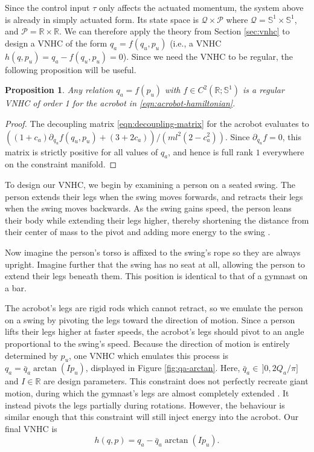 \documentclass[journal,twoside,web, twocolumn,draftcls]{ieeecolor}
\newtheorem{prop}{Proposition} %
\newcommand*{\R}{\mathbb{R}}
\newcommand*{\Sone}{\mathbb{S}^1}
\begin{document}
Since the control input \(\tau\) only affects the actuated momentum,
the system above is already in simply actuated form.
Its state space is \(\mathcal{Q} \times \mathcal{P}\) where
\(\mathcal{Q} = \Sone \times \Sone\), and
\(\mathcal{P} = \R \times \R\).
We can therefore apply the theory from Section \ref{sec:vnhc} to design
a VNHC of the form \(q_a = f(q_u,p_u)\) (i.e., a VNHC 
\(h(q,p_u) = q_a - f(q_u,p_u) = 0\)).
Since we need the VNHC to be regular, the following proposition will be
useful.
\begin{prop}\label{prop:acrobot-fpu-regular}
    Any relation \(q_a = f(p_u)\) 
    with \(f \in C^2\left(\R; \Sone\right)\) is a regular
    VNHC of order 1 for the acrobot in \eqref{eqn:acrobot-hamiltonian}.
\end{prop}
\begin{proof}
    The decoupling matrix \eqref{eqn:decoupling-matrix} for the acrobot
    evaluates to
    \(((1+c_a)\partial_{q_u}f(q_u,p_u) + (3+2c_a))/(ml^2(2-c_a^2))\).
    Since \(\partial_{q_u} f = 0\), this matrix is strictly positive for all values
    of \(q_a\), and hence is full rank \(1\) everywhere on the constraint manifold.
\end{proof}

To design our VNHC, we begin by examining a person on a
seated swing.
The person extends their legs when the swing moves forwards, and retracts their
legs when the swing moves backwards.
As the swing gains speed, the person leans their body while
extending their legs higher, thereby shortening the distance
from their center of mass to the pivot and adding more energy to the swing
\cite{how_to_pump_a_swing}.

Now imagine the person's torso is affixed to the swing's rope so they are
always upright. 
Imagine further that the swing has no seat at all, allowing the person to extend
their legs beneath them. 
This position is identical to that of a gymnast on a bar.

The acrobot's legs are rigid rods which cannot retract, so we emulate the person
on a swing by pivoting the legs toward the direction of motion. 
Since a person lifts their legs higher at faster speeds, the acrobot's legs should
pivot to an angle proportional to the swing's speed.
Because the direction of motion is entirely determined by \(p_u\), 
one VNHC which emulates this process is \(q_a = \bar{q}_a\arctan( I p_u)\),
displayed in Figure \ref{fig:qa-arctan}.
Here, \(\bar{q}_a \in \, ]0,2 Q_a/\pi]\) and \(I \in \R\) are 
design parameters.
This constraint does not perfectly recreate giant motion, during which
the gymnast's legs are almost completely extended \cite{usagym_giant}.
It instead pivots the legs partially during rotations.
However, the behaviour is similar enough that this constraint will
still inject energy into the acrobot.
Our final VNHC is
\begin{equation}\label{eqn:acrobot-constraint}
    h(q,p) = q_a - \bar{q}_a \arctan(I p_u)
    .
\end{equation}
\end{document}
